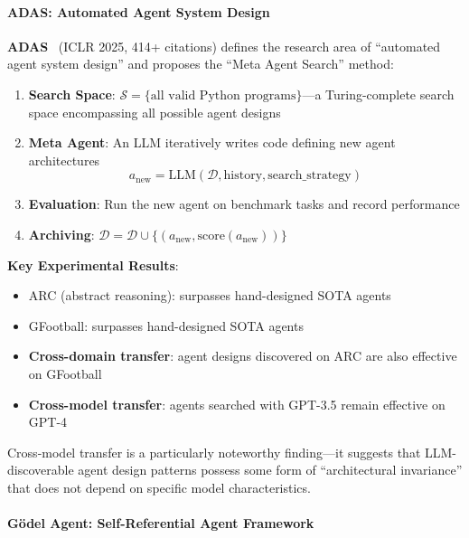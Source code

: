\paragraph{ADAS: Automated Agent System Design}

\textbf{ADAS}~\citep{adas2025} (ICLR 2025, 414+ citations) defines the research area of ``automated agent system design'' and proposes the ``Meta Agent Search'' method:

\begin{enumerate}
\item \textbf{Search Space}: $\mathcal{S} = \{\text{all valid Python programs}\}$---a Turing-complete search space encompassing all possible agent designs
\item \textbf{Meta Agent}: An LLM iteratively writes code defining new agent architectures
\begin{equation}
a_{\mathrm{new}} = \mathrm{LLM}(\mathcal{D}, \text{history}, \text{search\_strategy})
\label{eq:adas-search}
\end{equation}
\item \textbf{Evaluation}: Run the new agent on benchmark tasks and record performance
\item \textbf{Archiving}: $\mathcal{D} = \mathcal{D} \cup \{(a_{\mathrm{new}}, \text{score}(a_{\mathrm{new}}))\}$
\end{enumerate}

\textbf{Key Experimental Results}:
\begin{itemize}
\item ARC (abstract reasoning): surpasses hand-designed SOTA agents
\item GFootball: surpasses hand-designed SOTA agents
\item \textbf{Cross-domain transfer}: agent designs discovered on ARC are also effective on GFootball
\item \textbf{Cross-model transfer}: agents searched with GPT-3.5 remain effective on GPT-4
\end{itemize}

Cross-model transfer is a particularly noteworthy finding---it suggests that LLM-discoverable agent design patterns possess some form of ``architectural invariance'' that does not depend on specific model characteristics.

\paragraph{G\"{o}del Agent: Self-Referential Agent Framework}

